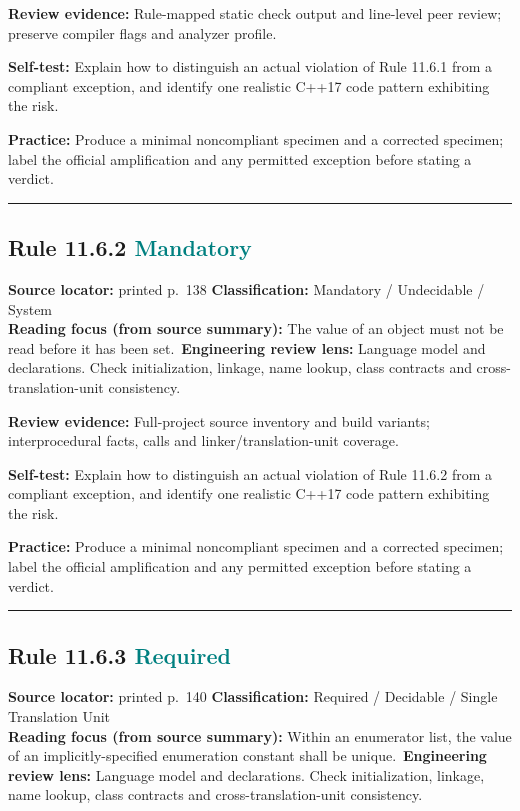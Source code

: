 \documentclass[10pt,letterpaper]{article}
\begin{document}
\textbf{Review evidence:} Rule-mapped static check output and line-level peer review; preserve compiler flags and analyzer profile.

\textbf{Self-test:} Explain how to distinguish an actual violation of Rule 11.6.1 from a compliant exception, and identify one realistic C++17 code pattern exhibiting the risk.\par
\textbf{Practice:} Produce a minimal noncompliant specimen and a corrected specimen; label the official amplification and any permitted exception before stating a verdict.
\smallskip\hrule\smallskip
\subsection*{Rule 11.6.2 \enspace \texorpdfstring{\small\textcolor{teal}{Mandatory}}{Mandatory}}
\noindent\textbf{Source locator:} printed p.~138 \quad\textbf{Classification:} Mandatory / Undecidable / System\\
\textbf{Reading focus (from source summary):} The value of an object must not be read before it has been set.\
\textbf{Engineering review lens:} Language model and declarations. Check initialization, linkage, name lookup, class contracts and cross-translation-unit consistency.

\textbf{Review evidence:} Full-project source inventory and build variants; interprocedural facts, calls and linker/translation-unit coverage.

\textbf{Self-test:} Explain how to distinguish an actual violation of Rule 11.6.2 from a compliant exception, and identify one realistic C++17 code pattern exhibiting the risk.\par
\textbf{Practice:} Produce a minimal noncompliant specimen and a corrected specimen; label the official amplification and any permitted exception before stating a verdict.
\smallskip\hrule\smallskip
\subsection*{Rule 11.6.3 \enspace \texorpdfstring{\small\textcolor{teal}{Required}}{Required}}
\noindent\textbf{Source locator:} printed p.~140 \quad\textbf{Classification:} Required / Decidable / Single Translation Unit\\
\textbf{Reading focus (from source summary):} Within an enumerator list, the value of an implicitly-specified enumeration constant shall be unique.\
\textbf{Engineering review lens:} Language model and declarations. Check initialization, linkage, name lookup, class contracts and cross-translation-unit consistency.
\end{document}
